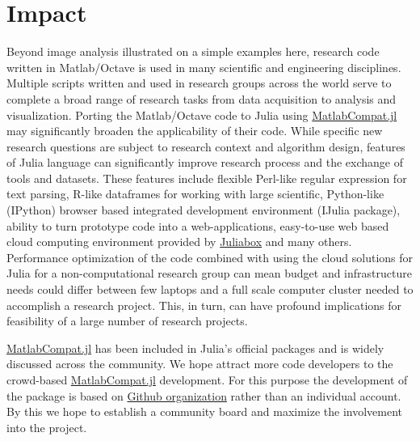 \section{Impact}

Beyond image analysis illustrated on a simple examples here, research code written in Matlab/Octave is used in many scientific and engineering disciplines. Multiple scripts written and used in research groups across the world serve to complete a broad range of research tasks from data acquisition to analysis and visualization. Porting the Matlab/Octave code to Julia using \href{https://github.com/MatlabCompat/MatlabCompat.jl}{MatlabCompat.jl} may significantly broaden the applicability of their code. While specific new research questions are subject to research context and algorithm design, features of Julia language can significantly improve research process and the exchange of tools and datasets. These features include flexible Perl-like regular expression for text parsing, R-like dataframes for working with large scientific, Python-like (IPython) browser based integrated development environment (IJulia package), ability to turn prototype code into a web-applications, easy-to-use web based cloud computing environment provided by \href{https://www.juliabox.org/}{Juliabox} and many others. Performance optimization of the code combined with using the cloud solutions for Julia for a non-computational research group can mean budget and infrastructure needs could differ between few laptops and a full scale computer cluster needed to accomplish a research project. This, in turn, can have profound implications for feasibility of a large number of research projects.

\href{https://github.com/MatlabCompat/MatlabCompat.jl}{MatlabCompat.jl} has been included in Julia's official packages and is widely discussed across the community. We hope attract more code developers to the crowd-based \href{https://github.com/MatlabCompat/MatlabCompat.jl}{MatlabCompat.jl} development. For this purpose the development of the package is based on \href{http://matlabcompat.github.io/}{Github organization} rather than an individual account. By this we hope to establish a community board and maximize the involvement into the project.
  
  